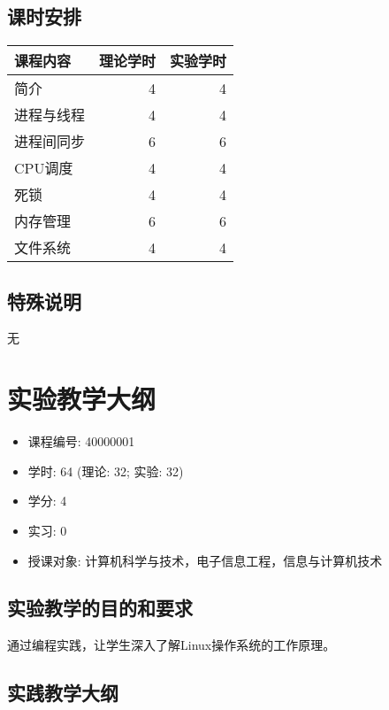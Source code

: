 \documentclass{wx672ctexart}
\begin{document}
\subsection{课时安排}
\label{sec-2-5}

\begin{center}
  \begin{tabular}{lrr}
    \hline
    课程内容 & 理论学时 & 实验学时\\
    \hline
    简介 & 4 & 4\\
    进程与线程 & 4 & 4\\
    进程间同步 & 6 & 6\\
    CPU调度 & 4 & 4\\
    死锁 & 4 & 4\\
    内存管理 & 6 & 6\\
    文件系统 & 4 & 4\\
    \hline
  \end{tabular}
\end{center}

\subsection{特殊说明}
\label{sec-2-6}

无

\section{实验教学大纲}
\label{sec:lab}

\begin{itemize}
\item 课程编号: 40000001
\item 学时: 64 (理论: 32; 实验: 32)
\item 学分: 4
\item 实习: 0
\item 授课对象: 计算机科学与技术，电子信息工程，信息与计算机技术
\end{itemize}

\subsection{实验教学的目的和要求}
\label{sec-3-1}

通过编程实践，让学生深入了解Linux操作系统的工作原理。

\subsection{实践教学大纲}
\label{sec-3-2}
\end{document}
